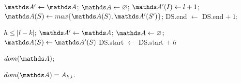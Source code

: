 \begin{algorithm}[H]
\caption{DS.insert(e)}
\begin{algorithmic}[1]
\State $\dsA' \gets \dsA$; $\dsA \gets \varnothing$;
\State $\dsA'(I) \gets l+1$;	 
            \State $\dsA(S) \gets max\{\dsA(S), \dsA'(S')\}$;
        \EndIf
    \EndFor
\EndFor
\State DS.end $\gets$ DS.end $+\ 1$;
\end{algorithmic}
\end{algorithm}

\begin{algorithm}[H]
\caption{DS.move(h)}
\begin{algorithmic}[1]
\Require $h \leq |l-k|$;		
\State $\dsA' \gets \dsA$; $\dsA \gets \varnothing$;
        \State $\dsA(S) \gets \dsA'(S)$
    \EndIf
\EndFor
\State DS.start $\gets$ DS.start $+\ h$
\end{algorithmic}
\end{algorithm}

\begin{algorithm}[H]
\caption{DS.states}
\begin{algorithmic}[1]
\State \Return $dom(\dsA)$;
\end{algorithmic}
\end{algorithm}


\begin{lemma}\label{lemma:dom_A}
$dom(\dsA) = A_{k,l}$.
\end{lemma}

